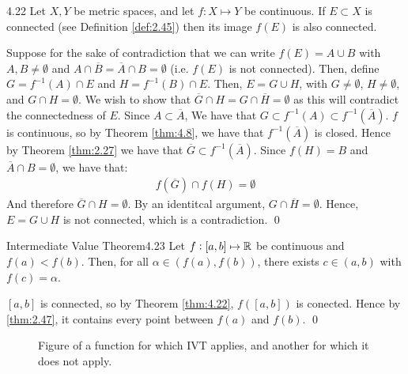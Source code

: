\setcounter{rudin}{21}
\begin{theorem}{}{4.22}
    Let $X, Y$ be metric spaces, and let $f: X \mapsto Y$ be continuous. If $E \subset X$ is connected (see Definition \ref{def:2.45}) then its image $f(E)$ is also connected.
\end{theorem}
\begin{nproof}
    Suppose for the sake of contradiction that we can write $f(E) = A \cup B$ with $A, B \neq \emptyset$ and $A \cap \overline{B} = \overline{A} \cap B = \emptyset$ (i.e. $f(E)$ is not connected). Then, define $G = f^{-1}(A) \cap E$ and $H = f^{-1}(B) \cap E$. Then, $E = G \cup H$, with $G \neq \emptyset$, $H \neq \emptyset$, and $G \cap H = \emptyset$. We wish to show that $\overline{G} \cap H = G \cap \overline{H} = \emptyset$ as this will contradict the connectedness of $E$. Since $A \subset \overline{A}$, We have that $G \subset f^{-1}(A) \subset f^{-1}(\overline{A})$. $f$ is continuous, so by Theorem \ref{thm:4.8}, we have that $f^{-1}(\overline{A})$ is closed. Hence by Theorem \ref{thm:2.27} we have that $\overline{G} \subset f^{-1}(\overline{A})$. Since $f(H) = B$ and $\overline{A} \cap B = \emptyset$, we have that:
    \begin{align*}
        f(\overline{G}) \cap f(H) = \emptyset
    \end{align*}
    And therefore $\overline{G} \cap H = \emptyset$. By an identitcal argument, $G \cap \overline{H} = \emptyset$. Hence, $E = G \cup H$ is not connected, which is a contradiction. \qed
\end{nproof}

\begin{theorem}{Intermediate Value Theorem}{4.23}
    Let $f: [a, b] \mapsto \mathbb{R}$ be continuous and $f(a) < f(b)$. Then, for all $\alpha \in (f(a), f(b))$, there exists $c \in (a, b)$ with $f(c) = \alpha$.
\end{theorem}
\begin{nproof}
    $[a, b]$ is connected, so by Theorem \ref{thm:4.22}, $f([a, b])$ is conected. Hence by \ref{thm:2.47}, it contains every point between $f(a)$ and $f(b)$. \qed
\end{nproof}

\begin{figure}[htbp]
    \centering
    
    \caption{Figure of a function for which IVT applies, and another for which it does not apply.}
    \label{fig20}
\end{figure}